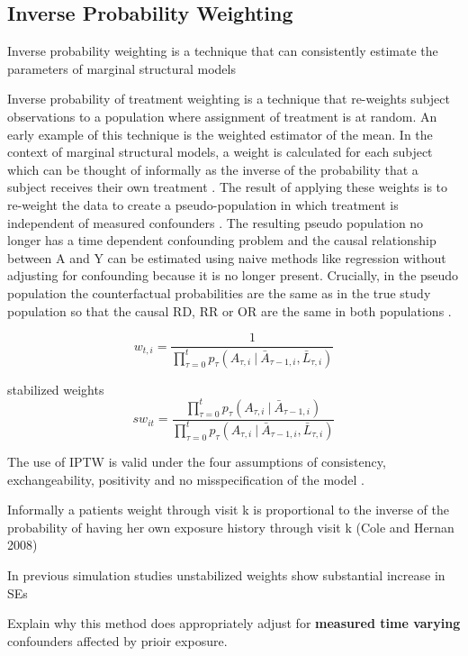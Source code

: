 \documentclass[11pt]{article}
\begin{document}
    \subsection{Inverse Probability
Weighting}\label{inverse-probability-weighting}

Inverse probability weighting is a technique that can consistently
estimate the parameters of marginal structural models \citet{Robins2000}

Inverse probability of treatment weighting is a technique that
re-weights subject observations to a population where assignment of
treatment is at random. An early example of this technique is the
\citet{Horovitz1952} weighted estimator of the mean. In the context of
marginal structural models, a weight is calculated for each subject
which can be thought of informally as the inverse of the probability
that a subject receives their own treatment \citet{Robins2000}. The
result of applying these weights is to re-weight the data to create a
pseudo-population in which treatment is independent of measured
confounders \citet{Cole2008}. The resulting pseudo population no longer
has a time dependent confounding problem and the causal relationship
between A and Y can be estimated using naive methods like regression
without adjusting for confounding because it is no longer present.
Crucially, in the pseudo population the counterfactual probabilities are
the same as in the true study population so that the causal RD, RR or OR
are the same in both populations \citet{Robins2000}.

\[w_{t,i} = \frac{1}{\prod_{\tau=0} ^ t p_{\tau} (A_{\tau, i}\ |\ \bar A_{\tau-1, i}, \bar L_{\tau, i})}\]

stabilized weights
\[sw_{it} = \frac{\prod_{\tau=0} ^ t p_{\tau} (A_{\tau, i}\ |\ \bar A_{\tau-1, i})} {\prod_{\tau=0} ^ t p_{\tau} (A_{\tau, i}\ |\ \bar A_{\tau-1, i}, \bar L_{\tau, i})}\]

The use of IPTW is valid under the four assumptions of consistency,
exchangeability, positivity and no misspecification of the model
\citet{Cole2008}.

Informally a patients weight through visit k is proportional to the
inverse of the probability of having her own exposure history through
visit k (Cole and Hernan 2008)

In previous simulation studies unstabilized weights show substantial
increase in SEs

Explain why this method does appropriately adjust for \textbf{measured
time varying} confounders affected by prioir exposure.
\end{document}
